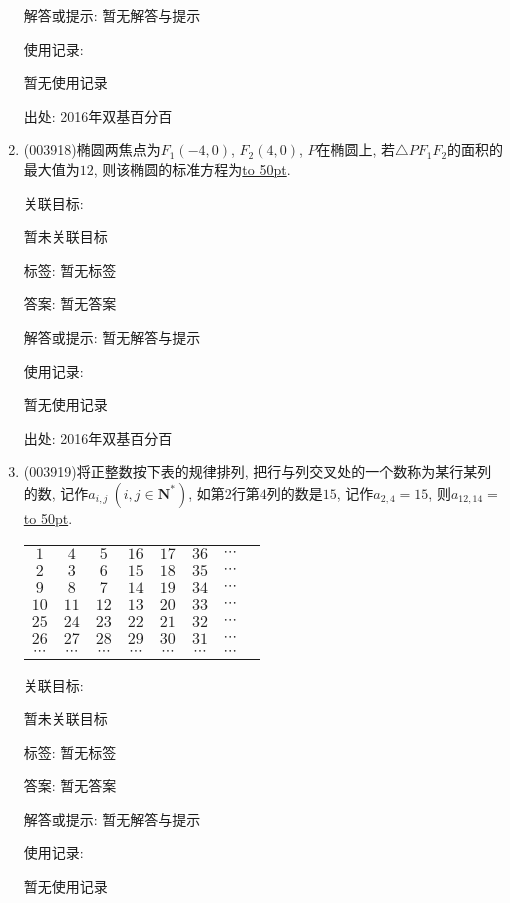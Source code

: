 \documentclass[10pt,a4paper]{article}
\newcommand{\blank}[1]{\underline{\hbox to #1pt{}}}
\begin{document}
\begin{enumerate}[1.]
解答或提示: 暂无解答与提示

使用记录:

暂无使用记录


出处: 2016年双基百分百
\item { (003918)}椭圆两焦点为$F_1(-4,0)$, $F_2(4,0)$, $P$在椭圆上, 若$\triangle PF_1F_2$的面积的最大值为$12$, 则该椭圆的标准方程为\blank{50}.


关联目标:

暂未关联目标



标签: 暂无标签

答案: 暂无答案

解答或提示: 暂无解答与提示

使用记录:

暂无使用记录


出处: 2016年双基百分百
\item { (003919)}将正整数按下表的规律排列, 把行与列交叉处的一个数称为某行某列的数, 记作$a_{i,j} \ (i,j\in \mathbf{N}^*)$, 如第$2$行第$4$列的数是$15$, 记作$a_{2,4}=15$, 则$a_{12,14}=$\blank{50}.
\begin{center}
\begin{tabular}{cccccccc}
$1$ & $4$ & $5$ & $16$ & $17$ & $36$ & $\cdots$\\
$2$ & $3$ & $6$ & $15$ & $18$ & $35$ & $\cdots$\\
$9$ & $8$ & $7$ & $14$ & $19$ & $34$ & $\cdots$\\
$10$ & $11$ & $12$ & $13$ & $20$ & $33$ & $\cdots$\\
$25$ & $24$ & $23$ & $22$ & $21$ & $32$ & $\cdots$\\
$26$ & $27$ & $28$ & $29$ & $30$ & $31$ & $\cdots$\\
$\cdots$ & $\cdots$ & $\cdots$ & $\cdots$ & $\cdots$ & $\cdots$ & $\cdots$
\end{tabular}
\end{center}


关联目标:

暂未关联目标



标签: 暂无标签

答案: 暂无答案

解答或提示: 暂无解答与提示

使用记录:

暂无使用记录



\end{enumerate}
\end{document}
